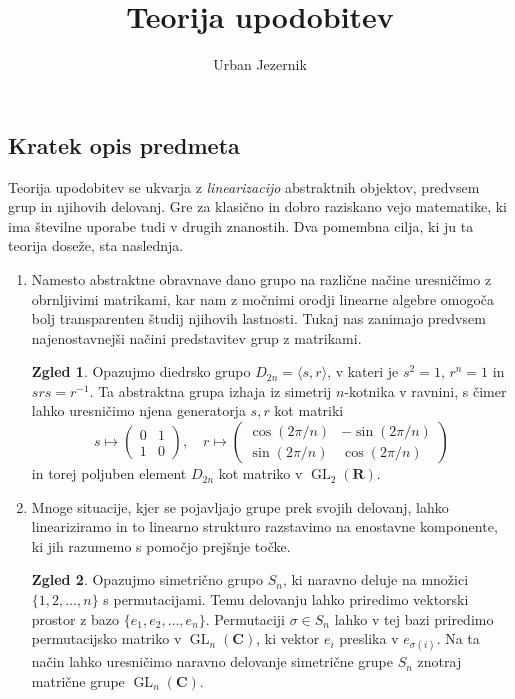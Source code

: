 \documentclass[11pt]{book}
\title{\bf Teorija upodobitev}
\author{Urban Jezernik}
\def\RR{\mathbf{R}}
\def\CC{\mathbf{C}}
\DeclareMathOperator\GL{GL}
\theoremstyle{definition}
\theoremstyle{zgled}
\newtheorem*{zgled}{Zgled}
\theoremstyle{odprtproblem}
\theoremstyle{domacanaloga}
\theoremstyle{izrek}
\begin{document}
\baselineskip=14pt

\maketitle

\setcounter{tocdepth}{1}
\tableofcontents

\newpage

\subsection*{Kratek opis predmeta}


Teorija upodobitev se ukvarja z \emph{linearizacijo} abstraktnih objektov, predvsem grup in njihovih delovanj. Gre za klasično in dobro raziskano vejo matematike, ki ima številne uporabe tudi v drugih znanostih. Dva pomembna cilja, ki ju ta teorija doseže, sta naslednja. 

\begin{enumerate}
    \item Namesto abstraktne obravnave dano grupo na različne načine uresničimo z obrnljivimi matrikami, kar nam z močnimi orodji linearne algebre omogoča bolj transparenten študij njihovih lastnosti. Tukaj nas zanimajo predvsem najenostavnejši načini predstavitev grup z matrikami.
    
    \begin{zgled}
        Opazujmo diedrsko grupo $D_{2n} = \langle s, r \rangle$, v kateri je $s^2 = 1$, $r^n = 1$ in $s r s = r^{-1}$. Ta abstraktna grupa izhaja iz simetrij $n$-kotnika v ravnini, s čimer lahko uresničimo njena generatorja $s,r$ kot matriki
        \[
            s \mapsto \begin{pmatrix}
                0 & 1 \\ 1 & 0
            \end{pmatrix}, \quad
            r \mapsto \begin{pmatrix}
                \cos(2 \pi/n) & - \sin(2 \pi/n) \\
                \sin(2 \pi/n) & \cos(2 \pi/n)
            \end{pmatrix}
        \]
        in torej poljuben element $D_{2n}$ kot matriko v $\GL_2(\RR)$.
    \end{zgled}

    \item Mnoge situacije, kjer se pojavljajo grupe prek svojih delovanj, lahko lineariziramo in to linearno strukturo razstavimo na enostavne komponente, ki jih razumemo s pomočjo prejšnje točke.
    
    \begin{zgled}
        Opazujmo simetrično grupo $S_n$, ki naravno deluje na množici $\{ 1, 2, \dots, n \}$ s permutacijami. Temu delovanju lahko priredimo vektorski prostor z bazo $\{ e_1, e_2, \dots, e_n \}$. Permutaciji $\sigma \in S_n$ lahko v tej bazi priredimo permutacijsko matriko v $\GL_n(\CC)$, ki vektor $e_i$ preslika v $e_{\sigma(i)}$. Na ta način lahko uresničimo naravno delovanje simetrične grupe $S_n$ znotraj matrične grupe $\GL_n(\CC)$.
    \end{zgled}
\end{enumerate}
\end{document}
